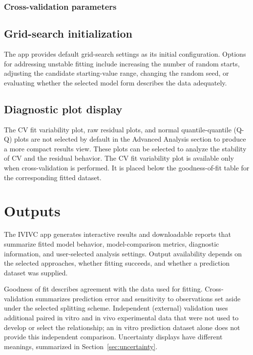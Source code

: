 \subsubsection{Cross-validation parameters}



\subsection{Grid-search initialization}



The app provides default grid-search settings as its initial configuration. Options for addressing unstable fitting include increasing the number of random starts, adjusting the candidate starting-value range, changing the random seed, or evaluating whether the selected model form describes the data adequately.



\subsection{Diagnostic plot display}

The CV fit variability plot, raw residual plots, and normal quantile-quantile (Q-Q) plots are not selected by default in the Advanced Analysis section to produce a more compact results view. These plots can be selected to analyze the stability of CV and the residual behavior. The CV fit variability plot is available only when cross-validation is performed. It is placed below the goodness-of-fit table for the corresponding fitted dataset.

\section{Outputs}

The IVIVC app generates interactive results and downloadable reports that summarize fitted model behavior, model-comparison metrics, diagnostic information, and user-selected analysis settings. Output availability depends on the selected approaches, whether fitting succeeds, and whether a prediction dataset was supplied.

Goodness of fit describes agreement with the data used for fitting. Cross-validation summarizes prediction error and sensitivity to observations set aside under the selected splitting scheme. Independent (external) validation uses additional paired in vitro and in vivo experimental data that were not used to develop or select the relationship; an in vitro prediction dataset alone does not provide this independent comparison. Uncertainty displays have different meanings, summarized in Section~\ref{sec:uncertainty}.

